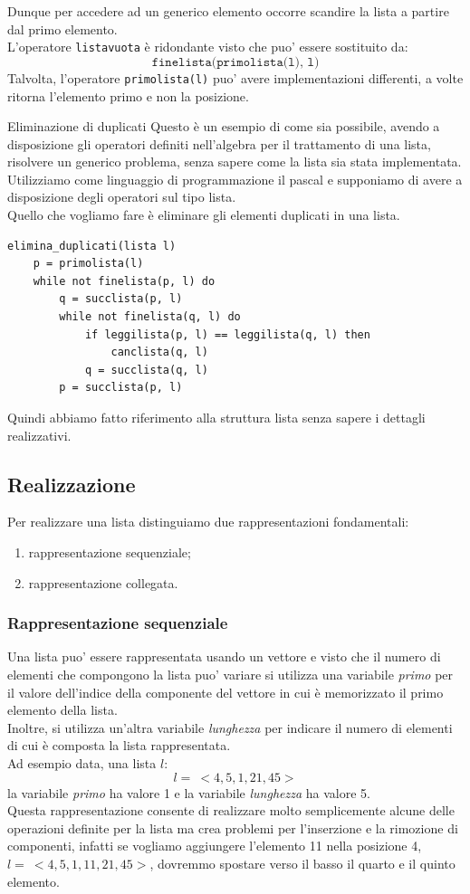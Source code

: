 \documentclass[12pt]{report}
\newcommand{\nmu}{}
\begin{document}
	Dunque per accedere ad un generico elemento occorre scandire la lista a partire dal primo elemento. \\
	L'operatore \texttt{listavuota} è ridondante visto che puo' essere sostituito da: \[\texttt{finelista(primolista(l), l)}\]
	Talvolta, l'operatore \texttt{primolista(l)} puo' avere implementazioni differenti, a volte ritorna l'elemento primo e non la posizione.
	\begin{example}{\nmu Eliminazione di duplicati}{}
		Questo è un esempio di come sia possibile, avendo a disposizione gli operatori definiti nell'algebra per il trattamento di una lista, risolvere un generico problema, senza sapere come la lista sia stata implementata. \\
		Utilizziamo come linguaggio di programmazione il pascal e supponiamo di avere a disposizione degli operatori sul tipo lista. \\
		Quello che vogliamo fare è eliminare gli elementi duplicati in una lista. \\
		\begin{lstlisting}[style=pascalstyle]
elimina_duplicati(lista l)
	p = primolista(l)
	while not finelista(p, l) do
		q = succlista(p, l)
		while not finelista(q, l) do
			if leggilista(p, l) == leggilista(q, l) then
				canclista(q, l)
			q = succlista(q, l)
		p = succlista(p, l)
		\end{lstlisting}
		Quindi abbiamo fatto riferimento alla struttura lista senza sapere i dettagli realizzativi.
	\end{example}
	\subsection{Realizzazione}
	Per realizzare una lista distinguiamo due rappresentazioni fondamentali:
	\begin{enumerate}
		\item rappresentazione sequenziale;
		\item rappresentazione collegata.
	\end{enumerate}
	\subsubsection{Rappresentazione sequenziale}
	Una lista puo' essere rappresentata usando un vettore e visto che il numero di elementi che compongono la lista puo' variare si utilizza una variabile \textit{primo} per il valore dell'indice della componente del vettore in cui è memorizzato il primo elemento della lista. \\
	Inoltre, si utilizza un'altra variabile \textit{lunghezza} per indicare il numero di elementi di cui è composta la lista rappresentata. \\
	Ad esempio data, una lista $l$:
	\[
	l =\ <4, 5, 1, 21, 45>
	\]
	la variabile \textit{primo} ha valore 1 e la variabile \textit{lunghezza} ha valore 5. \\
	Questa rappresentazione consente di realizzare molto semplicemente alcune delle operazioni definite per la lista ma crea problemi per l'inserzione e la rimozione di componenti, infatti se vogliamo aggiungere l'elemento 11 nella posizione 4, $l =\ <4, 5, 1, 11, 21, 45>$, dovremmo spostare verso il basso il quarto e il quinto elemento.
\end{document}
